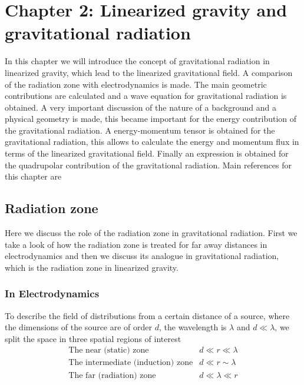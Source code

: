 \chapter{Chapter 2: Linearized gravity and gravitational radiation\label{chp2}}
In this chapter we will introduce the concept of gravitational radiation in linearized gravity, which lead to the linearized gravitational field. A comparison of the radiation zone with electrodynamics is made. The main geometric contributions are calculated and a wave equation for gravitational radiation is obtained. A very important discussion of the nature of a background and a physical geometry is made, this became important for the energy contribution of the gravitational radiation. A energy-momentum tensor is obtained for the gravitational radiation, this allows to calculate the energy and momentum flux in terms of the linearized gravitational field. Finally an expression is obtained for the quadrupolar contribution of the gravitational radiation. Main references for this chapter are \cite{JACKSON,PAPER,CARROLL,THORNE-EX,MAGGIORE,GRAVITATION, HORTUA, POISSON, Isaacson-b, WinNT}

\section{Radiation zone}

Here we discuss the role of the radiation zone in gravitational radiation.
First we take a look of how the radiation zone is treated for far
away distances in electrodynamics and then we discuss its analogue
in gravitational radiation, which is the radiation zone in linearized
gravity.

\subsection{In Electrodynamics}

To describe the field of distributions from a certain distance of
a source, where the dimensions of the source are of order $d$, the
wavelength is $\lambda$ and $d\ll\lambda$, we split the space in
three spatial regions of interest
\[
\begin{array}{ll}
\text{The near (static) zone} & d\ll r\ll\lambda\\
\text{The intermediate (induction) zone} & d\ll r\sim\lambda\\
\text{The far (radiation) zone} & d\ll\lambda\ll r
\end{array}
\]

